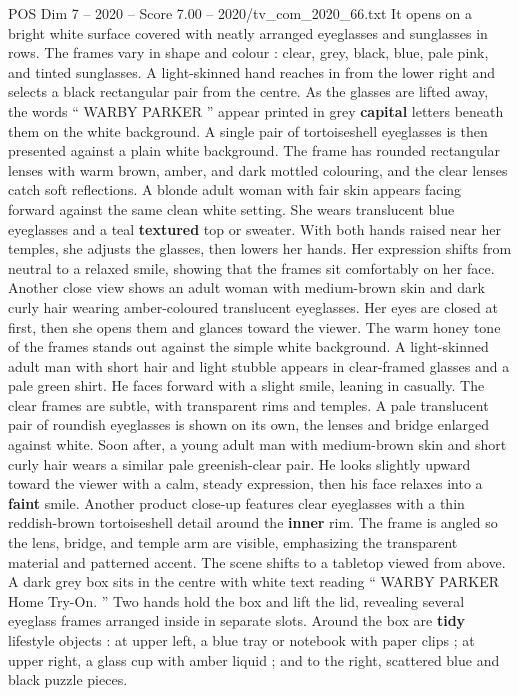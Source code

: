 \begin{textsample}{POS Dim 7 – 2020 – Score 7.00 – 2020/tv\_com\_2020\_66.txt}  \label{ex:f7_pos_085}
It opens on a bright white surface covered with neatly arranged eyeglasses and sunglasses in rows.
The frames vary in shape and colour : clear, grey, black, blue, pale pink, and tinted sunglasses.
A light-skinned hand reaches in from the lower right and selects a black rectangular pair from the centre.
As the glasses are lifted away, the words “ WARBY PARKER ” appear printed in grey \textbf{capital} letters beneath them on the white background.
A single pair of tortoiseshell eyeglasses is then presented against a plain white background.
The frame has rounded rectangular lenses with warm brown, amber, and dark mottled colouring, and the clear lenses catch soft reflections.
A blonde adult woman with fair skin appears facing forward against the same clean white setting.
She wears translucent blue eyeglasses and a teal \textbf{textured} top or sweater.
With both hands raised near her temples, she adjusts the glasses, then lowers her hands.
Her expression shifts from neutral to a relaxed smile, showing that the frames sit comfortably on her face.
Another close view shows an adult woman with medium-brown skin and dark curly hair wearing amber-coloured translucent eyeglasses.
Her eyes are closed at first, then she opens them and glances toward the viewer.
The warm honey tone of the frames stands out against the simple white background.
A light-skinned adult man with short hair and light stubble appears in clear-framed glasses and a pale green shirt.
He faces forward with a slight smile, leaning in casually.
The clear frames are subtle, with transparent rims and temples.
A pale translucent pair of roundish eyeglasses is shown on its own, the lenses and bridge enlarged against white.
Soon after, a young adult man with medium-brown skin and short curly hair wears a similar pale greenish-clear pair.
He looks slightly upward toward the viewer with a calm, steady expression, then his face relaxes into a \textbf{faint} smile.
Another product close-up features clear eyeglasses with a thin reddish-brown tortoiseshell detail around the \textbf{inner} rim.
The frame is angled so the lens, bridge, and temple arm are visible, emphasizing the transparent material and patterned accent.
The scene shifts to a tabletop viewed from above.
A dark grey box sits in the centre with white text reading “ WARBY PARKER Home Try-On. ” Two hands hold the box and lift the lid, revealing several eyeglass frames arranged inside in separate slots.
Around the box are \textbf{tidy} lifestyle objects : at upper left, a blue tray or notebook with paper clips ; at upper right, a glass cup with amber liquid ; and to the right, scattered blue and black puzzle pieces.

\end{textsample}
